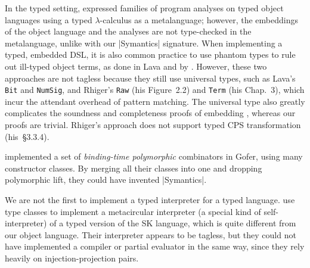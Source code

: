 In the typed
setting, \citet{Nielson88} expressed families of program analyses on
typed object languages using a typed $\lambda$-calculus as
a metalanguage; however, the embeddings of the
object language and the analyses are not type-checked in the
metalanguage, unlike with our |Symantics| signature.
When implementing a typed, embedded DSL\@,
it is also common practice to use phantom types to rule out
ill-typed object terms, as done in Lava
\citep{Lava} and by \citet{Rhiger-thesis}. However, these two approaches
are not tagless because they still use universal types, such as Lava's
\texttt{Bit} and \texttt{NumSig}, and Rhiger's \texttt{Raw} (his Figure~2.2)
and \texttt{Term} (his Chap.~3), which incur the attendant overhead of
pattern matching.  The universal type also
greatly complicates the soundness and completeness proofs of embedding
\citep{Rhiger-thesis}, whereas our proofs are trivial.
Rhiger's approach does not support typed CPS transformation (his~\S3.3.4).
\begin{comment}
Rhiger's But Fig 2.2, p33: universal type Raw.  He uses phantom type
upon the Exp datatype. But that is cheating: phantom type means
essentially we can easily do coerce. We use real types.  That's why he
had to do tedious proofs in Sec 2 of soundness and completeness of
embedding. Whereas our proofs are obvious.  His sec 3 is based on data
representation of terms. They have type tags.  We do nothing of that
kind: See Sec 3.1.2. See numerous "data Term" in Sec3, which is the U
type.  In Sec 3.3.4 (p76) Rhiger specifically says that his encoding
cannot do typed CPS transformation -- whereas our does. BTW, Rhiger
thesis contains the definitions of the interpreter and the compiler,
in the beginning. Use this in response to Rev1
\end{comment}

implemented a set of \emph{binding-time polymorphic}
combinators in Gofer, using many constructor classes.
By merging all their classes into one and dropping
polymorphic lift, they could have invented
|Symantics|.

We are not the first to implement a typed interpreter for a typed
language.   use type classes to implement a metacircular
interpreter (a special kind of self\hyp interpreter) of a
typed version of the SK language, which is quite different from our
object language.  Their interpreter
appears to be tagless, but they could not have implemented a
compiler or partial evaluator in the same way, since they rely
heavily on injection\hyp projection pairs.

